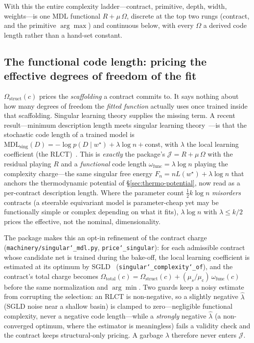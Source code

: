 \documentclass[11pt]{article}
\newcommand{\allowbreakhere}{\discretionary{}{}{}}
\newcommand{\code}[1]{\texttt{\def\_{\char`_\allowbreakhere}#1}}
\begin{document}
With this the entire complexity ladder---contract, primitive, depth, width, weights---is one MDL
functional $R+\mu\,\Omega$, discrete at the top two rungs (contract, and the primitive $\arg\max$) and
continuous below, with every $\Omega$ a derived code length rather than a hand-set constant.

\subsection{The functional code length: pricing the effective degrees of freedom of the fit}
\label{sec:singular-mdl}

$\Omega_{\mathrm{struct}}(c)$ prices the \emph{scaffolding} a contract commits to. It says nothing about
how many degrees of freedom the \emph{fitted function} actually uses once trained inside that scaffolding.
Singular learning theory supplies the missing term. A recent result---minimum
description length meets singular learning theory~\cite{urdshals2025mdl}---is that the stochastic code length of a trained model
is $\mathrm{MDL}_{\mathrm{sing}}(D)=-\log p(D\mid w^\star)+\lambda\log n+\mathrm{const}$, with $\lambda$
the local learning coefficient (the RLCT)~\cite{lau2023llc,watanabe2009slt}. This is \emph{exactly} the
package's $\mathcal J=R+\mu\,\Omega$ with the residual playing $R$ and a \emph{functional} code length
$\omega_{\mathrm{func}}=\lambda\log n$ playing the complexity charge---the same singular free energy
$F_n=nL(w^\star)+\lambda\log n$ that anchors the thermodynamic potential of
\S\ref{sec:thermo-potential}, now read as a per-contract description length. Where the parameter count
$\tfrac12 k\log n$ \emph{misorders} contracts (a steerable equivariant model is parameter-cheap yet may be
functionally simple or complex depending on what it fits), $\lambda\log n$ with $\lambda\le k/2$ prices the
effective, not the nominal, dimensionality.

The package makes this an opt-in refinement of the contract charge (\code{machinery/singular\_mdl.py},
\code{price\_singular}): for each admissible contract whose candidate net is trained during the bake-off,
the local learning coefficient is estimated at its optimum by SGLD~\cite{lau2023llc}
(\code{singular\_complexity\_of}), and the contract's total charge becomes
$\Omega_{\mathrm{total}}(c)=\Omega_{\mathrm{struct}}(c)+(\mu_s/\mu_{\mathrm c})\,\omega_{\mathrm{func}}(c)$
before the same normalization and $\arg\min$. Two guards keep a noisy estimate from corrupting the
selection: an RLCT is non-negative, so a slightly negative $\hat\lambda$ (SGLD noise near a shallow basin)
is clamped to zero---negligible functional complexity, never a negative code length---while a
\emph{strongly} negative $\hat\lambda$ (a non-converged optimum, where the estimator is meaningless) fails
a validity check and the contract keeps structural-only pricing. A garbage $\lambda$ therefore never enters
$\mathcal J$.
\end{document}
